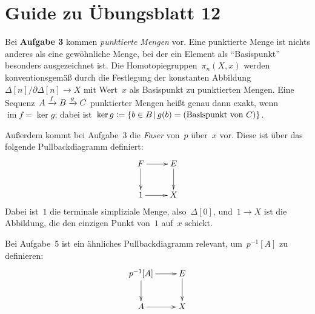 \documentclass{uebblatt}
\begin{document}
\section*{Guide zu Übungsblatt 12}

Bei \textbf{Aufgabe 3} kommen \emph{punktierte Mengen} vor. Eine punktierte
Menge ist nichts anderes als eine gewöhnliche Menge, bei der ein Element als
"`Basispunkt"' besonders ausgezeichnet ist. Die Homotopiegruppen~$\pi_n(X,x)$ werden
konventionsgemäß durch die Festlegung der konstanten
Abbildung~$\Delta[n]/\partial \Delta[n] \to X$ mit Wert~$x$ als Basispunkt zu
punktierten Mengen. Eine Sequenz~$A \xrightarrow{f} B \xrightarrow{g} C$ punktierter Mengen heißt genau
dann exakt, wenn~$\operatorname{im} f = \operatorname{ker} g$; dabei
ist~$\operatorname{ker} g \vcentcolon= \{ b \in B \,|\, g(b) = (\text{Basispunkt
von~$C$}) \}$.

Außerdem kommt bei Aufgabe~3 die \emph{Faser} von~$p$ über~$x$ vor. Diese ist
über das folgende Pullbackdiagramm definiert:
\[ \xymatrix{
  F \ar[r]\ar[d] & E \ar[d] \\
  1 \ar[r] & X
} \]
Dabei ist~$1$ die terminale simpliziale Menge, also~$\Delta[0]$, und~$1 \to X$
ist die Abbildung, die den einzigen Punkt von~$1$ auf~$x$ schickt.

Bei Aufgabe~5 ist ein ähnliches Pullbackdiagramm relevant, um~$p^{-1}[A]$ zu
definieren:
\[ \xymatrix{
  p^{-1}[A] \ar[r]\ar[d] & E \ar[d] \\
  A \ar[r] & X
} \]
\end{document}
